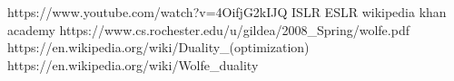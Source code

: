 https://www.youtube.com/watch?v=4OifjG2kIJQ
ISLR
ESLR
wikipedia
khan academy
https://www.cs.rochester.edu/u/gildea/2008_Spring/wolfe.pdf
https://en.wikipedia.org/wiki/Duality_(optimization)
https://en.wikipedia.org/wiki/Wolfe_duality
